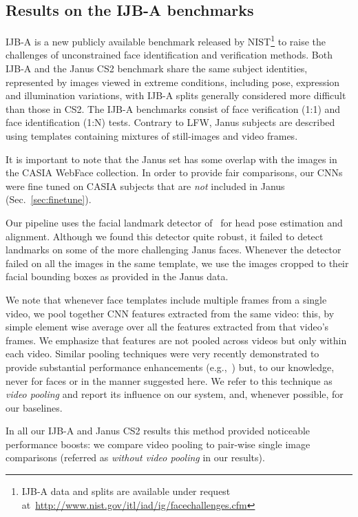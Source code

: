 \documentclass[runningheads]{llncs}
\newcommand{\minisection}[1]{\vspace{0.04in} \noindent {\bf #1:} }
\begin{document}
\subsection{Results on the IJB-A benchmarks}\label{sec:janus}
IJB-A is a new publicly available benchmark released by NIST\footnote{IJB-A data and splits are available under request at~\url{http://www.nist.gov/itl/iad/ig/facechallenges.cfm}} to raise the challenges of unconstrained face identification and verification methods. Both IJB-A and the Janus CS2 benchmark share the same subject identities, represented by images viewed in extreme conditions, including pose, expression and illumination variations, with IJB-A splits generally considered more difficult than those in CS2. The IJB-A benchmarks consist of face verification (1:1) and face identification (1:N) tests. Contrary to LFW, Janus subjects are described using templates containing mixtures of still-images and video frames. 

It is important to note that the Janus set has some overlap with the images in the CASIA WebFace collection. In order to provide fair comparisons, our CNNs were fine tuned on CASIA subjects that are {\em not} included in Janus (Sec.~\ref{sec:finetune}).


\minisection{Face detections} Our pipeline uses the facial landmark detector of~\cite{lp:landmark} for head pose estimation and alignment. Although we found this detector quite robust, it failed to detect landmarks on some of the more challenging Janus faces. Whenever the detector failed on all the images in the same template, we use the images cropped to their facial bounding boxes as provided in the Janus data. 

\minisection{Video pooling} We note that whenever face templates include multiple frames from a single video, we pool together CNN features extracted from the same video: this, by simple element wise average over all the features extracted from that video's frames. We emphasize that features are not pooled across videos but only within each video. Similar pooling techniques were very recently demonstrated to provide substantial performance enhancements (e.g.,~\cite{su2015multi}) but, to our knowledge, never for faces or in the manner suggested here. We refer to this technique as {\em video pooling} and report its influence on our system, and, whenever possible, for our baselines. 

In all our IJB-A and Janus CS2 results this method provided noticeable performance boosts: we compare video pooling to pair-wise single image comparisons (referred as {\em without video pooling} in our results). 
\end{document}
